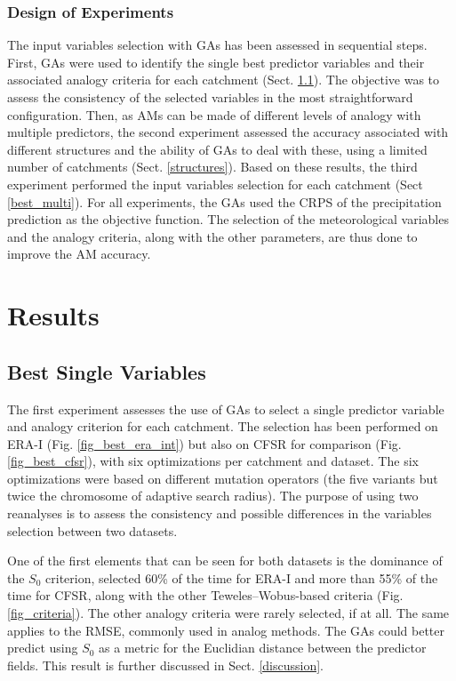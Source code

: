 \documentclass[draft]{agujournal2019}
\begin{document}
\subsubsection{Design of Experiments}
\label{experiments}

The input variables selection with GAs has been assessed in sequential steps. First, GAs were used to identify the single best predictor variables and their associated analogy criteria for each catchment (Sect. \ref{best_single}). The objective was to assess the consistency of the selected variables in the most straightforward configuration. Then, as AMs can be made of different levels of analogy with multiple predictors, the second experiment assessed the accuracy associated with different structures and the ability of GAs to deal with these, using a limited number of catchments (Sect. \ref{structures}). Based on these results, the third experiment performed the input variables selection for each catchment (Sect \ref{best_multi}). For all experiments, the GAs used the CRPS of the precipitation prediction as the objective function. The selection of the meteorological variables and the analogy criteria, along with the other parameters, are thus done to improve the AM accuracy.


\section{Results}
\label{results}

\subsection{Best Single Variables}
\label{best_single}

The first experiment assesses the use of GAs to select a single predictor variable and analogy criterion for each catchment. The selection has been performed on ERA-I (Fig. \ref{fig_best_era_int}) but also on CFSR for comparison (Fig. \ref{fig_best_cfsr}), with six optimizations per catchment and dataset. The six optimizations were based on different mutation operators (the five variants but twice the chromosome of adaptive search radius). The purpose of using two reanalyses is to assess the consistency and possible differences in the variables selection between two datasets.

One of the first elements that can be seen for both datasets is the dominance of the $S_{0}$ criterion, selected 60\% of the time for ERA-I and more than 55\% of the time for CFSR, along with the other Teweles--Wobus-based criteria (Fig. \ref{fig_criteria}). The other analogy criteria were rarely selected, if at all. The same applies to the RMSE, commonly used in analog methods. The GAs could better predict using $S_{0}$ as a metric for the Euclidian distance between the predictor fields. This result is further discussed in Sect. \ref{discussion}.
\end{document}
